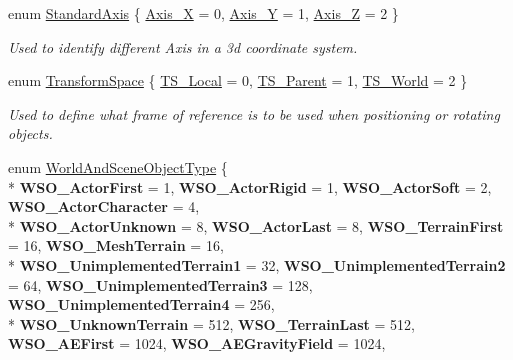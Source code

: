 \begin{DoxyCompactItemize}
enum \hyperlink{namespaceMezzanine_ab41a00a8c6a47b576dc987ec34e16ba1}{Standard\-Axis} \{ \hyperlink{namespaceMezzanine_ab41a00a8c6a47b576dc987ec34e16ba1a823c8f182393aef96f017c7279d49126}{Axis\-\_\-\-X} =  0, 
\hyperlink{namespaceMezzanine_ab41a00a8c6a47b576dc987ec34e16ba1a935c7afe0104697553cf85e9214fb3fb}{Axis\-\_\-\-Y} =  1, 
\hyperlink{namespaceMezzanine_ab41a00a8c6a47b576dc987ec34e16ba1a6af6621383cc7da1fe11a86ba6de37c0}{Axis\-\_\-\-Z} =  2
 \}
\begin{DoxyCompactList}\small\item\em Used to identify different Axis in a 3d coordinate system. \end{DoxyCompactList}\item 
enum \hyperlink{namespaceMezzanine_ad81c74de3529f1e643bd145173924ed3}{Transform\-Space} \{ \hyperlink{namespaceMezzanine_ad81c74de3529f1e643bd145173924ed3aa1986039b3e4c80c8564c8916e68e61c}{T\-S\-\_\-\-Local} =  0, 
\hyperlink{namespaceMezzanine_ad81c74de3529f1e643bd145173924ed3a352c41c07844c77508ce36b43a30b553}{T\-S\-\_\-\-Parent} =  1, 
\hyperlink{namespaceMezzanine_ad81c74de3529f1e643bd145173924ed3aeb8fde3835a59be182f10353d961882d}{T\-S\-\_\-\-World} =  2
 \}
\begin{DoxyCompactList}\small\item\em Used to define what frame of reference is to be used when positioning or rotating objects. \end{DoxyCompactList}\item 
enum \hyperlink{namespaceMezzanine_ae8cd04f706f4998be62f454b7119c718}{World\-And\-Scene\-Object\-Type} \{ \\*
{\bfseries W\-S\-O\-\_\-\-Actor\-First} =  1, 
{\bfseries W\-S\-O\-\_\-\-Actor\-Rigid} =  1, 
{\bfseries W\-S\-O\-\_\-\-Actor\-Soft} =  2, 
{\bfseries W\-S\-O\-\_\-\-Actor\-Character} =  4, 
\\*
{\bfseries W\-S\-O\-\_\-\-Actor\-Unknown} =  8, 
{\bfseries W\-S\-O\-\_\-\-Actor\-Last} =  8, 
{\bfseries W\-S\-O\-\_\-\-Terrain\-First} =  16, 
{\bfseries W\-S\-O\-\_\-\-Mesh\-Terrain} =  16, 
\\*
{\bfseries W\-S\-O\-\_\-\-Unimplemented\-Terrain1} =  32, 
{\bfseries W\-S\-O\-\_\-\-Unimplemented\-Terrain2} =  64, 
{\bfseries W\-S\-O\-\_\-\-Unimplemented\-Terrain3} =  128, 
{\bfseries W\-S\-O\-\_\-\-Unimplemented\-Terrain4} =  256, 
\\*
{\bfseries W\-S\-O\-\_\-\-Unknown\-Terrain} =  512, 
{\bfseries W\-S\-O\-\_\-\-Terrain\-Last} =  512, 
{\bfseries W\-S\-O\-\_\-\-A\-E\-First} =  1024, 
{\bfseries W\-S\-O\-\_\-\-A\-E\-Gravity\-Field} =  1024, 

\end{DoxyCompactItemize}
